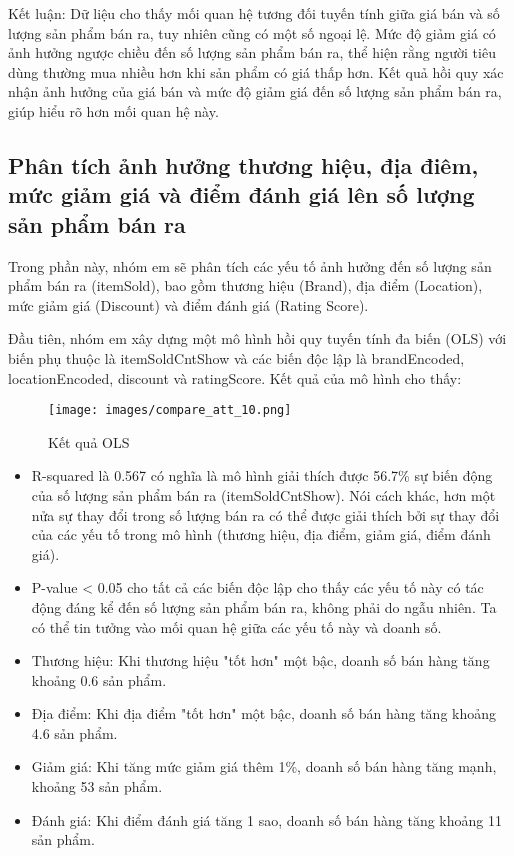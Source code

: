 Kết luận: Dữ liệu cho thấy mối quan hệ tương đối tuyến tính giữa giá bán và số lượng sản phẩm bán ra, tuy nhiên cũng có một số ngoại lệ.
Mức độ giảm giá có ảnh hưởng ngược chiều đến số lượng sản phẩm bán ra, thể hiện rằng người tiêu dùng thường mua nhiều hơn khi sản phẩm có giá thấp hơn.
Kết quả hồi quy xác nhận ảnh hưởng của giá bán và mức độ giảm giá đến số lượng sản phẩm bán ra, giúp hiểu rõ hơn mối quan hệ này.\\


\subsection{Phân tích ảnh hưởng thương hiệu, địa điêm, mức giảm giá và điểm đánh giá lên số lượng sản phẩm bán ra} \label{Phân tích product 2}

Trong phần này, nhóm em sẽ phân tích các yếu tố ảnh hưởng đến số lượng sản phẩm bán ra (itemSold), bao gồm thương hiệu (Brand), địa điểm (Location), mức giảm giá (Discount) và điểm đánh giá (Rating Score).

Đầu tiên, nhóm em xây dựng một mô hình hồi quy tuyến tính đa biến (OLS) với biến phụ thuộc là itemSoldCntShow và các biến độc lập là brandEncoded, locationEncoded, discount và ratingScore. Kết quả của mô hình cho thấy:

\begin{figure}[H]
    \centering
    \texttt{[image: images/compare\_att\_10.png]}
    \caption{Kết quả OLS}
    \label{fig:piechart_item_listed}
\end{figure}

\begin{itemize}
    \item R-squared là 0.567 có nghĩa là mô hình giải thích được 56.7\% sự biến động của số lượng sản phẩm bán ra (itemSoldCntShow). Nói cách khác, hơn một nửa sự thay đổi trong số lượng bán ra có thể được giải thích bởi sự thay đổi của các yếu tố trong mô hình (thương hiệu, địa điểm, giảm giá, điểm đánh giá). 
    
    \item P-value < 0.05 cho tất cả các biến độc lập cho thấy các yếu tố này có tác động đáng kể đến số lượng sản phẩm bán ra, không phải do ngẫu nhiên. Ta có thể tin tưởng vào mối quan hệ giữa các yếu tố này và doanh số.

    \item Thương hiệu: Khi thương hiệu "tốt hơn" một bậc, doanh số bán hàng tăng khoảng 0.6 sản phẩm.
    
    \item Địa điểm: Khi địa điểm "tốt hơn" một bậc, doanh số bán hàng tăng khoảng 4.6 sản phẩm.
    
    \item Giảm giá: Khi tăng mức giảm giá thêm 1\%, doanh số bán hàng tăng mạnh, khoảng 53 sản phẩm.
    
    \item Đánh giá: Khi điểm đánh giá tăng 1 sao, doanh số bán hàng tăng khoảng 11 sản phẩm.
\end{itemize}

